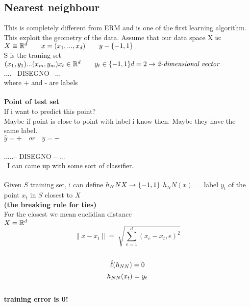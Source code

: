 \documentclass[../main.tex]{subfiles}
\begin{document}
\subsection{Nearest neighbour}
This is completely different from ERM and is one of the first learning
algorithm. This exploit the geometry of the data.
Assume that our data space X is:
\\
$ X \equiv \mathbb{R}^d \qquad x = (x_1, ..., x_d) \qquad y-\{-1,1\}
$
\\
S is the traning set $(x_1,y_1)...(x_m,y_m) \\ x_t \in \mathbb{R}^d \qquad y_t \in \{-1,1\} \\\\
d = 2 \rightarrow \textit{2-dimensional vector}\\
$\\
....-- DISEGNO --...
\\
where + and - are labels
\\\\
\textbf{Point of test set}
\\
If i want to predict this point?
\\
Maybe if point is close to point with label i know then. Maybe they have the same label.
\\
$\hat{y} = + \quad or \quad  \hat{y} = - $
\\\\
.....-- DISEGNO -- ...
\\\
I can came up with some sort of classifier.
\\\\
Given $S$ training set, i can define $h_NN X \rightarrow \{-1,1\}\\
$
$h_NN(x) = $ label $y_t$ of the point $x_t$ in $S$ closest to $X$\\
\textbf{(the breaking rule for ties)}
\\
For the closest we mean euclidian distance
\\
$ X = \mathbb{R}^d
\\
$
$$ 
\| x - x_t \| = \sqrt[] {\sum_{e=1}^{d} (x_e-x_t,e)^2}
$$\\
$$
\hat{\ell}(h_{NN}) = 0  
$$
$$
h_{NN} (x_t) = y_t
$$
\\
\textbf{training error is 0!}
\end{document}

